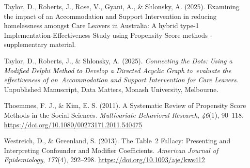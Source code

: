 \documentclass[
  jou,
  floatsintext,
  longtable,
  nolmodern,
  notxfonts,
  notimes,
  colorlinks=true,linkcolor=blue,citecolor=blue,urlcolor=blue]{apa7}
\newlength{\cslhangindent}
\newenvironment{CSLReferences}[2] %
 {\begin{list}{}{%
  \setlength{\itemindent}{0pt}
  \setlength{\leftmargin}{0pt}
  \setlength{\parsep}{0pt}
  \ifodd #1
   \setlength{\leftmargin}{\cslhangindent}
   \setlength{\itemindent}{-1\cslhangindent}
  \fi
  \setlength{\itemsep}{#2\baselineskip}}}
 {\end{list}}
\begin{document}
\begin{CSLReferences}{1}{0}
Taylor, D., Roberts, J., Rose, V., Gyani, A., \& Shlonsky, A. (2025).
Examining the impact of an {Accommodation} and {Support Intervention} in
reducing homelessness amongst {Care Leavers} in {Australia}: {A} hybrid
type-1 {Implementation-Effectiveness Study} using {Propensity Score}
methods - supplementary material.

Taylor, D., Roberts, J., \& Shlonsky, A. (2025). \emph{Connecting the
{Dots}: {Using} a {Modified Delphi Method} to {Develop} a {Directed
Acyclic Graph} to~evaluate the effectiveness of an~{Accommodation} and
{Support Intervention} for {Care Leavers}}. Unpublished Manuscript, Data
Matters, Monash University, Melbourne.

Thoemmes, F. J., \& Kim, E. S. (2011). A {Systematic Review} of
{Propensity Score Methods} in the {Social Sciences}. \emph{Multivariate
Behavioral Research}, \emph{46}(1), 90--118.
\url{https://doi.org/10.1080/00273171.2011.540475}

Westreich, D., \& Greenland, S. (2013). The {Table}~2 {Fallacy}:
{Presenting} and {Interpreting Confounder} and {Modifier Coefficients}.
\emph{American Journal of Epidemiology}, \emph{177}(4), 292--298.
\url{https://doi.org/10.1093/aje/kws412}

\end{CSLReferences}
\end{document}
